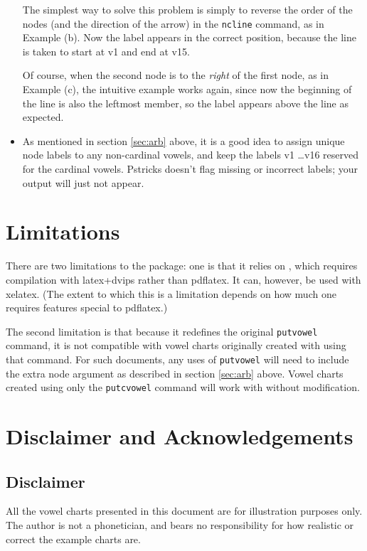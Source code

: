 \documentclass{article}
\begin{document}
\begin{itemize}[listparindent=\parindent, itemsep=\baselineskip,parsep=0pt]
The simplest way to solve this problem is simply to reverse the order of the nodes (and the direction of the arrow) in the \texttt{\bs ncline} command, as in Example (b). Now the label appears in the correct position, because the line is taken to start at v1 and end at v15.

Of course, when the second node is to the \emph{right} of the first node, as in Example (c), the intuitive example works again, since now the beginning of the line is also the leftmost member, so the label appears above the line as expected.

\item As mentioned in section \ref{sec:arb} above, it is a good idea to assign unique node labels to any non-cardinal vowels, and keep the labels v1 \ldots v16 reserved for the cardinal vowels. Pstricks doesn't flag missing or incorrect labels; your output will just not appear.

\end{itemize}
 
\section{Limitations}
There are two limitations to the package: one is that it relies on , which requires compilation with latex+dvips rather than pdflatex. It can, however, be used with xelatex. (The extent to which this is a limitation depends on how much one requires features special to pdflatex.)  

The second limitation  is that because it redefines the original \texttt{\bs putvowel} command, it is not compatible with vowel charts originally created with  using that command. For such documents, any uses of \texttt{\bs putvowel} will need to include the extra node argument as described in section \ref{sec:arb} above. Vowel charts created using only the \texttt{\bs putcvowel} command will work with  without modification.
\section{Disclaimer and Acknowledgements}
\subsection{Disclaimer}
All the vowel charts presented in this document are for illustration purposes only. The author is not a phonetician, and bears no responsibility for how realistic or correct the example charts are.
\end{document}
